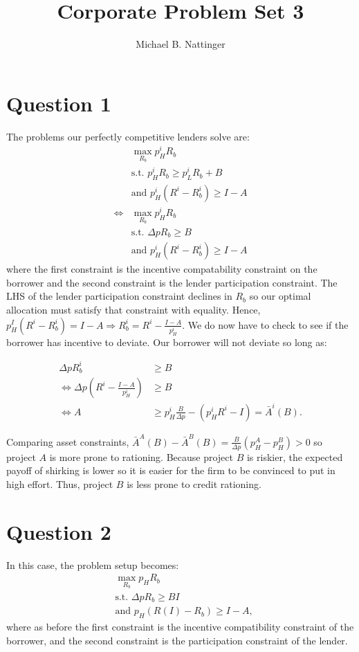 \documentclass[11pt]{article} %
\title{Corporate Problem Set 3}
\author{Michael B. Nattinger}
\begin{document}
\maketitle
\section{Question 1}
The problems our perfectly competitive lenders solve are:
\begin{align*}
&\max_{R_b} p_H^i R_b\\
&\text{s.t. } p_H^i R_b \geq p_L^i R_b + B\\
&\text{and } p_H^i (R^i-R_b^i) \geq I-A \\
\iff &\max_{R_b} p_H^i R_b\\
&\text{s.t. } \Delta p R_b \geq  B \\
&\text{and } p_H^i (R^i-R_b^i) \geq I-A
\end{align*}
where the first constraint is the incentive compatability constraint on the borrower and the second constraint is the lender participation constraint. The LHS of the lender participation constraint declines in $R_b$ so our optimal allocation must satisfy that constraint with equality. Hence, $p_H^I(R^i-R_b^i) = I-A \Rightarrow R_b^i = R^i - \frac{I-A}{p_H^i}$. We do now have to check to see if the borrower has incentive to deviate. Our borrower will not deviate so long as:

\begin{align*}
\Delta p R_b^i &\geq B \\
\iff \Delta p \left( R^i - \frac{I-A}{p_H^i}\right) &\geq B\\
\iff A&\geq p_H^i \frac{B}{\Delta p} - (p_H^iR^i - I) = \bar{A}^i(B).
\end{align*}

Comparing asset constraints, $\bar{A}^A(B) - \bar{A}^B(B) = \frac{B}{\Delta p}(p_H^A -p_H^B) >0$ so project $A$ is more prone to rationing. Because project $B$ is riskier, the expected payoff of shirking is lower so it is easier for the firm to be convinced to put in high effort. Thus, project $B$ is less prone to credit rationing.

\section{Question 2}
In this case, the problem setup becomes:
\begin{align*}
&\max_{R_b} p_H R_b \\
&\text{s.t. } \Delta p R_b \geq BI\\
&\text{and } p_H(R(I) - R_b)\geq I-A,
\end{align*}
where as before the first constraint is the incentive compatibility constraint of the borrower, and the second constraint is the participation constraint of the lender.
\end{document}

